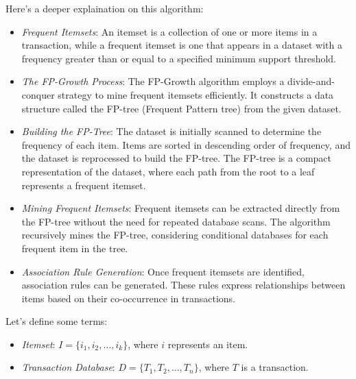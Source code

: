 \begin{enumerate}
        Here's a deeper explaination on this algorithm:

        \begin{itemize}

            \item \emph{Frequent Itemsets}: An itemset is a collection of one or more items in a transaction, while a frequent itemset is one that appears in a dataset with a frequency greater than or equal to a specified minimum support threshold.
            
            \item \emph{The FP-Growth Process}: The FP-Growth algorithm employs a divide-and-conquer strategy to mine frequent itemsets efficiently. It constructs a data structure called the FP-tree (Frequent Pattern tree) from the given dataset.
            
            \item \emph{Building the FP-Tree}: The dataset is initially scanned to determine the frequency of each item. Items are sorted in descending order of frequency, and the dataset is reprocessed to build the FP-tree. The FP-tree is a compact representation of the dataset, where each path from the root to a leaf represents a frequent itemset.

            \item \emph{Mining Frequent Itemsets}: Frequent itemsets can be extracted directly from the FP-tree without the need for repeated database scans. The algorithm recursively mines the FP-tree, considering conditional databases for each frequent item in the tree.

            \item \emph{Association Rule Generation}: Once frequent itemsets are identified, association rules can be generated. These rules express relationships between items based on their co-occurrence in transactions.

        \end{itemize}

        Let's define some terms:

        \begin{itemize}

            \item \emph{Itemset}: $I = \{i_1, i_2, \ldots, i_k\}$, where $i$ represents an item.

            \item \emph{Transaction Database}: $D = \{T_1, T_2, \ldots, T_n\}$, where $T$ is a transaction.


\end{itemize}
\end{enumerate}
